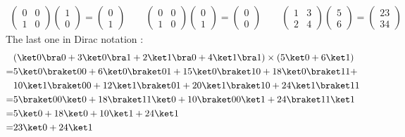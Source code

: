 \label{ex1.2:matrix}
\begin{align*}
\left(\begin{array}{cccc}
 0 &0 \\
 1 &0
\end{array}\right)
\left(\begin{array}{c}
 1\\
 0
\end{array}\right)
=
\left(\begin{array}{c}
 0\\
 1
\end{array}\right)
\qquad
\left(\begin{array}{cccc}
 0 &0\\
 1 &0
\end{array}\right)
\left(\begin{array}{c}
 0\\
 1
\end{array}\right)
=
\left(\begin{array}{c}
 0\\
 0
\end{array}\right)
\qquad
\left(\begin{array}{cccc}
 1 &3 \\
 2 &4
\end{array}\right)
\left(\begin{array}{c}
 5\\
 6
\end{array}\right)
=
\left(\begin{array}{c}
 23\\
 34
\end{array}\right)
\end{align*}
The last one in Dirac notation :
\begin{align*}
  &(\ket 0 \bra 0 + 3\ket 0 \bra 1 + 2 \ket 1 \bra 0 + 4 \ket 1 \bra 1)\times
  (5\ket 0 + 6 \ket 1) \\
  =&5\ket 0 \braket 0 0 + 6 \ket 0 \braket 0 1 + 15 \ket 0 \braket 1 0 + 18
    \ket 0 \braket 1 1 + \\
  & 10 \ket 1 \braket 0 0 + 12 \ket 1 \braket 0 1 + 20 \ket 1 \braket 1 0 +
    24 \ket 1 \braket 1 1\\
  =&5 \braket 0 0 \ket 0 + 18 \braket 1 1 \ket 0 + 10 \braket 0 0 \ket 1 +
  24 \braket 1 1 \ket 1 \\
  =&5 \ket 0 + 18 \ket 0 + 10 \ket 1 + 24 \ket 1 \\
  =&23  \ket 0 + 24 \ket 1
\end{align*}

